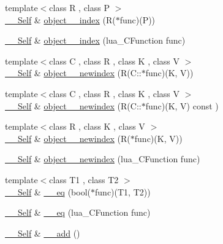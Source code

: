 \begin{DoxyCompactItemize}
\item 
{\footnotesize template$<$class R , class P $>$ }\\\hyperlink{classSLB_1_1Class_aef6fc94f5e50c96268e669ab6946ad8b}{\+\_\+\+\_\+\+Self} \& \hyperlink{classSLB_1_1Class_a05a6368e8a55613f4185b38deece7f31}{object\+\_\+\+\_\+index} (R($\ast$func)(P))
\item 
\hyperlink{classSLB_1_1Class_aef6fc94f5e50c96268e669ab6946ad8b}{\+\_\+\+\_\+\+Self} \& \hyperlink{classSLB_1_1Class_a1957f69399a6653b188d006744fa605d}{object\+\_\+\+\_\+index} (lua\+\_\+\+C\+Function func)
\item 
{\footnotesize template$<$class C , class R , class K , class V $>$ }\\\hyperlink{classSLB_1_1Class_aef6fc94f5e50c96268e669ab6946ad8b}{\+\_\+\+\_\+\+Self} \& \hyperlink{classSLB_1_1Class_afdb8a4975205acde5afe0f6b73328837}{object\+\_\+\+\_\+newindex} (R(C\+::$\ast$func)(K, V))
\item 
{\footnotesize template$<$class C , class R , class K , class V $>$ }\\\hyperlink{classSLB_1_1Class_aef6fc94f5e50c96268e669ab6946ad8b}{\+\_\+\+\_\+\+Self} \& \hyperlink{classSLB_1_1Class_a16f337a1414c6d64e22840ba404fe828}{object\+\_\+\+\_\+newindex} (R(C\+::$\ast$func)(K, V) const )
\item 
{\footnotesize template$<$class R , class K , class V $>$ }\\\hyperlink{classSLB_1_1Class_aef6fc94f5e50c96268e669ab6946ad8b}{\+\_\+\+\_\+\+Self} \& \hyperlink{classSLB_1_1Class_a8bc6a000bd1cb5ff2f31dd2cc9947fb7}{object\+\_\+\+\_\+newindex} (R($\ast$func)(K, V))
\item 
\hyperlink{classSLB_1_1Class_aef6fc94f5e50c96268e669ab6946ad8b}{\+\_\+\+\_\+\+Self} \& \hyperlink{classSLB_1_1Class_a2915fbd909590100450f847df7d11122}{object\+\_\+\+\_\+newindex} (lua\+\_\+\+C\+Function func)
\item 
{\footnotesize template$<$class T1 , class T2 $>$ }\\\hyperlink{classSLB_1_1Class_aef6fc94f5e50c96268e669ab6946ad8b}{\+\_\+\+\_\+\+Self} \& \hyperlink{classSLB_1_1Class_a492dc3ce63a4a01470c65be5b402019c}{\+\_\+\+\_\+eq} (bool($\ast$func)(T1, T2))
\item 
\hyperlink{classSLB_1_1Class_aef6fc94f5e50c96268e669ab6946ad8b}{\+\_\+\+\_\+\+Self} \& \hyperlink{classSLB_1_1Class_a5bd847347ab3834d80d7eee85120767f}{\+\_\+\+\_\+eq} (lua\+\_\+\+C\+Function func)
\item 
\hyperlink{classSLB_1_1Class_aef6fc94f5e50c96268e669ab6946ad8b}{\+\_\+\+\_\+\+Self} \& \hyperlink{classSLB_1_1Class_a8a58ed8fb718d00323b14b4ce5dee3d4}{\+\_\+\+\_\+add} ()

\end{DoxyCompactItemize}
